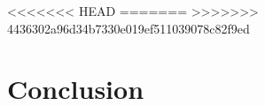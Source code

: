 %
%
<<<<<<< HEAD
\glsresetall
=======
\acresetall
>>>>>>> 4436302a96d34b7330e019ef511039078c82f9ed
\graphicspath{{./chapters/chapter07/fig07/}}

\let\textcircled=\pgftextcircled
\chapter{Conclusion}
\label{chap:conclusion}




